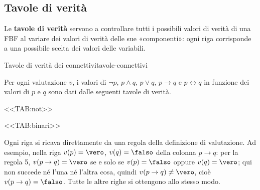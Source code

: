 \subsection{Tavole di verità}\label{sec:tavole}

Le \textbf{tavole di verità} servono a controllare tutti i possibili valori di verità di una FBF al variare
dei valori di verità delle sue «componenti»: ogni riga corrisponde a una possibile scelta dei valori delle variabili.

\begin{concetto}
\begin{Proposizione}{Tavole di verità dei connettivi}{tavole-connettivi}
    \begin{prerequisiti}
    \end{prerequisiti}
    Per ogni valutazione $v$, i valori di $\neg p$, $p \wedge q$, $p \vee q$, $p \rightarrow q$ e $p \leftrightarrow q$
    in funzione dei valori di $p$ e $q$ sono dati dalle seguenti tavole di verità.

    <<TAB:not>>

    <<TAB:binari>>
\end{Proposizione}

\begin{dimostrazione}
    Ogni riga si ricava direttamente da una regola della definizione di valutazione.
    Ad esempio, nella riga $v(p) = \vero$, $v(q) = \falso$ della colonna $p \rightarrow q$: per la regola 5,
    $v(p \rightarrow q) = \vero$ se e solo se $v(p) = \falso$ oppure $v(q) = \vero$; qui non succede né l'una
    né l'altra cosa, quindi $v(p \rightarrow q) \neq \vero$, cioè $v(p \rightarrow q) = \falso$.
    Tutte le altre righe si ottengono allo stesso modo.
\end{dimostrazione}
\end{concetto}


